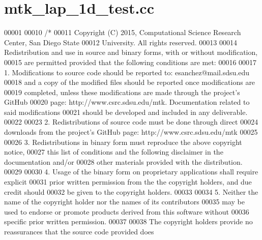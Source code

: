 \hypertarget{mtk__lap__1d__test_8cc_source}{\section{mtk\+\_\+lap\+\_\+1d\+\_\+test.\+cc}
\label{mtk__lap__1d__test_8cc_source}
}

\begin{DoxyCode}
00001 
00010 \textcolor{comment}{/*}
00011 \textcolor{comment}{Copyright (C) 2015, Computational Science Research Center, San Diego State}
00012 \textcolor{comment}{University. All rights reserved.}
00013 \textcolor{comment}{}
00014 \textcolor{comment}{Redistribution and use in source and binary forms, with or without modification,}
00015 \textcolor{comment}{are permitted provided that the following conditions are met:}
00016 \textcolor{comment}{}
00017 \textcolor{comment}{1. Modifications to source code should be reported to: esanchez@mail.sdsu.edu}
00018 \textcolor{comment}{and a copy of the modified files should be reported once modifications are}
00019 \textcolor{comment}{completed, unless these modifications are made through the project's GitHub}
00020 \textcolor{comment}{page: http://www.csrc.sdsu.edu/mtk. Documentation related to said modifications}
00021 \textcolor{comment}{should be developed and included in any deliverable.}
00022 \textcolor{comment}{}
00023 \textcolor{comment}{2. Redistributions of source code must be done through direct}
00024 \textcolor{comment}{downloads from the project's GitHub page: http://www.csrc.sdsu.edu/mtk}
00025 \textcolor{comment}{}
00026 \textcolor{comment}{3. Redistributions in binary form must reproduce the above copyright notice,}
00027 \textcolor{comment}{this list of conditions and the following disclaimer in the documentation and/or}
00028 \textcolor{comment}{other materials provided with the distribution.}
00029 \textcolor{comment}{}
00030 \textcolor{comment}{4. Usage of the binary form on proprietary applications shall require explicit}
00031 \textcolor{comment}{prior written permission from the the copyright holders, and due credit should}
00032 \textcolor{comment}{be given to the copyright holders.}
00033 \textcolor{comment}{}
00034 \textcolor{comment}{5. Neither the name of the copyright holder nor the names of its contributors}
00035 \textcolor{comment}{may be used to endorse or promote products derived from this software without}
00036 \textcolor{comment}{specific prior written permission.}
00037 \textcolor{comment}{}
00038 \textcolor{comment}{The copyright holders provide no reassurances that the source code provided does}

\end{DoxyCode}
